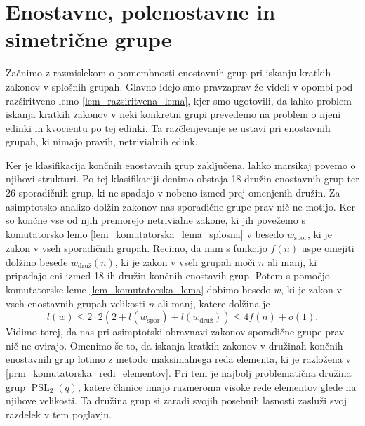\section{Enostavne, polenostavne in simetrične grupe}



Začnimo z razmislekom o pomembnosti enostavnih grup pri iskanju kratkih zakonov v splošnih grupah. Glavno idejo smo pravzaprav že videli v opombi pod razširitveno lemo \ref{lem_razsiritvena_lema}, kjer smo ugotovili, da
lahko problem iskanja kratkih zakonov v neki konkretni grupi prevedemo na problem o njeni edinki in kvocientu po tej edinki. Ta razčlenjevanje se ustavi pri enostavnih grupah, ki nimajo pravih, netrivialnih edink.

Ker je klasifikacija končnih enostavnih grup zaključena, lahko marsikaj povemo o njihovi strukturi. Po tej klasifikaciji denimo obstaja 18 družin enostavnih grup ter 26 sporadičnih grup, ki ne spadajo v nobeno izmed prej omenjenih družin.
Za asimptotsko analizo dolžin zakonov nas sporadične grupe prav nič ne motijo. Ker so končne vse od njih premorejo netrivialne zakone, ki jih povežemo s komutatorsko lemo \ref{lem_komutatorska_lema_splosna} v besedo $w_{\text{spor}}$,
ki je zakon v vseh sporadičnih grupah. Recimo, da nam s funkcijo $f(n)$ uspe omejiti dolžino besede $w_{\text{druž}}(n)$, ki je zakon v vseh grupah moči $n$ ali manj, ki pripadajo eni izmed 18-ih družin končnih enostavih grup.
Potem s pomočjo komutatorske leme \ref{lem_komutatorska_lema} dobimo besedo $w$, ki je zakon v vseh enostavnih grupah velikosti $n$ ali manj, katere dolžina je 
\begin{equation*}
    l(w) \le 2 \cdot 2 (2 + l(w_{\text{spor}}) + l(w_{\text{druž}}) )  \le 4f(n) + o(1).
\end{equation*}
Vidimo torej, da nas pri asimptotski obravnavi zakonov sporadične grupe prav nič ne ovirajo. Omenimo še to, da iskanja kratkih zakonov v družinah končnih enostavnih grup
lotimo z metodo maksimalnega reda elementa, ki je razložena v \ref{prm_komutatorska_redi_elementov}. Pri tem je najbolj problematična družina grup $\operatorname{PSL}_2(q)$,
katere članice imajo razmeroma visoke rede elementov glede na njihove velikosti. Ta družina grup si zaradi svojih posebnih lasnosti zasluži svoj razdelek v tem poglavju.

